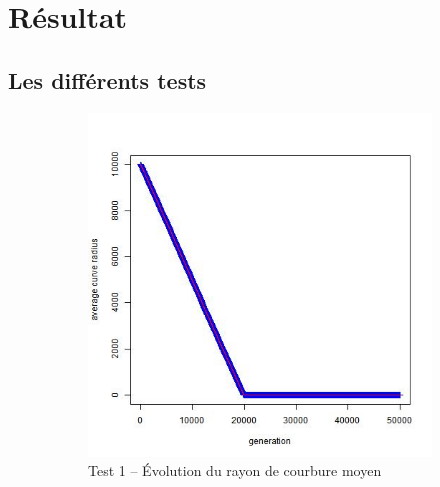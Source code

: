 \documentclass[a4paper,11pt]{article}
\begin{document}
\section{Résultat}

\subsection{Les différents tests}

\begin{figure}
\centering
\begin{subfigure}{.5\textwidth}
  \centering
\includegraphics[width=1\linewidth]{1487422477451_evolution_average_curve_radius.jpeg}
\caption{Test 1 – Évolution du rayon de courbure moyen}
\label{fig:sub11}
\end{subfigure}%
\begin{subfigure}{.5\textwidth}
  \centering

\end{subfigure}
\end{figure}
\end{document}
